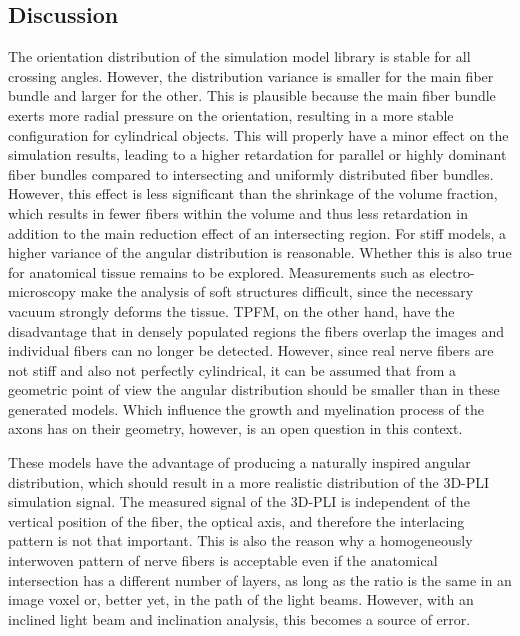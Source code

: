 \subsection{Discussion}
% 
The orientation distribution of the simulation model library is stable for all crossing angles.
However, the distribution variance is smaller for the main fiber bundle and larger for the other.
This is plausible because the main fiber bundle exerts more radial pressure on the orientation, resulting in a more stable configuration for cylindrical objects.
This will properly have a minor effect on the simulation results, leading to a higher retardation for parallel or highly dominant fiber bundles compared to intersecting and uniformly distributed fiber bundles.
However, this effect is less significant than the shrinkage of the volume fraction, which results in fewer fibers within the volume and thus less retardation in addition to the main reduction effect of an intersecting region.
For stiff models, a higher variance of the angular distribution is reasonable.
Whether this is also true for anatomical tissue remains to be explored.
Measurements such as electro-microscopy make the analysis of soft structures difficult, since the\textbf{} necessary vacuum strongly deforms the tissue.
\ac{TPFM}, on the other hand, have the disadvantage that in densely populated regions the fibers overlap the images and individual fibers can no longer be detected.
However, since real nerve fibers are not stiff and also not perfectly cylindrical, it can be assumed that from a geometric point of view the angular distribution should be smaller than in these generated models.
Which influence the growth and myelination process of the axons has on their geometry, however, is an open question in this context.
\par
%
These models have the advantage of producing a naturally inspired angular distribution, which should result in a more realistic distribution of the \ac{3D-PLI} simulation signal.
The measured signal of the \ac{3D-PLI} is independent of the vertical position of the fiber, the optical axis, and therefore the interlacing pattern is not that important.
This is also the reason why a homogeneously interwoven pattern of nerve fibers is acceptable even if the anatomical intersection has a different number of layers, as long as the ratio is the same in an image voxel or, better yet, in the path of the light beams.
However, with an inclined light beam and inclination analysis, this becomes a source of error.